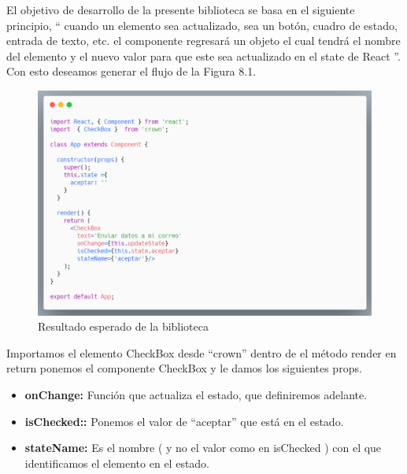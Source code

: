         El objetivo de desarrollo de la presente biblioteca se basa en el siguiente principio, “ cuando un elemento sea actualizado, sea un botón, cuadro de estado, entrada de texto, etc. el componente regresará un objeto el cual tendrá el nombre del elemento y el nuevo valor para que este sea actualizado en el state de React ”.  Con esto deseamos generar el  flujo de la Figura 8.1.
        
               \begin{figure}[H]
           \includegraphics[width=1\textwidth]{./Imagenes/carbon-8.png}
           \caption[Resultado esperado de la biblioteca]{Resultado esperado de la biblioteca}
             \end{figure}
        
        Importamos el elemento CheckBox desde “crown” dentro de el método render en return  ponemos el componente CheckBox y le damos los  siguientes  props.
        
        \begin{itemize}
        	\item \textbf{onChange:} Función que actualiza el estado, que definiremos adelante.
        	\item \textbf{isChecked::} Ponemos el valor de “aceptar” que está en el estado.
        	\item \textbf{stateName:}  Es el nombre ( y no el valor como en isChecked ) con el que identificamos el elemento en el estado. 
        \end{itemize}
        

